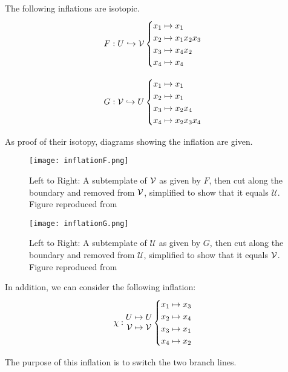 \documentclass[paper.tex]{subfiles}
\begin{document}
\begin{prop}
    The following inflations are isotopic.
$$F: U \hookrightarrow \mathcal{V} \begin{cases} x_1 \mapsto x_1 \\ x_2 \mapsto x_1 x_2 x_3 \\ x_3 \mapsto x_4 x_2 \\ x_4 \mapsto x_4 \end{cases}$$

$$G: \mathcal{V} \hookrightarrow U \begin{cases} x_1 \mapsto x_1 \\ x_2 \mapsto x_1 \\ x_3 \mapsto x_2 x_4 \\ x_4 \mapsto x_2 x_3 x_4 \end{cases}$$
\end{prop}

As proof of their isotopy, diagrams showing the inflation are given.


\begin{figure}[h]
  \centering
  \texttt{[image: inflationF.png]}
  \caption{Left to Right: A subtemplate of $\mathcal{V}$ as given by $F$, then cut along the boundary and removed from $\mathcal{V}$, simplified to show that it equals $\mathcal{U}$. Figure reproduced from~\cite{ghs1997}}\label{fig:isotopicF}
\end{figure}

\begin{figure}[h]
  \centering
  \texttt{[image: inflationG.png]}
  \caption{Left to Right: A subtemplate of $\mathcal{U}$ as given by $G$, then cut along the boundary and removed from $\mathcal{U}$, simplified to show that it equals $\mathcal{V}$. Figure reproduced from~\cite{ghs1997}}\label{fig:isotopicG}
\end{figure}


In addition, we can consider the following inflation: $$\chi: \begin{matrix} U \mapsto U \\ \mathcal{V} \mapsto \mathcal{V} \end{matrix} \begin{cases} x_1 \mapsto x_3 \\ x_2 \mapsto x_4 \\ x_3 \mapsto x_1 \\ x_4 \mapsto x_2 \end{cases}$$

    The purpose of this inflation is to switch the two branch lines.
\end{document}
